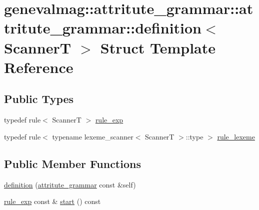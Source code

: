 \hypertarget{structgenevalmag_1_1attritute__grammar_1_1definition}{
\section{genevalmag::attritute\_\-grammar::attritute\_\-grammar::definition$<$ ScannerT $>$ Struct Template Reference}
\label{structgenevalmag_1_1attritute__grammar_1_1definition}
}
\subsection*{Public Types}
\begin{CompactItemize}
\item 
typedef rule$<$ ScannerT $>$ \hyperlink{structgenevalmag_1_1attritute__grammar_1_1definition_309e68f77fe3e7c0ebb0f06416bce39c}{rule\_\-exp}
\item 
typedef rule$<$ typename lexeme\_\-scanner$<$ ScannerT $>$::type $>$ \hyperlink{structgenevalmag_1_1attritute__grammar_1_1definition_af4afa908dd79792cfa7d2a3963b80d6}{rule\_\-lexeme}
\end{CompactItemize}
\subsection*{Public Member Functions}
\begin{CompactItemize}
\item 
\hyperlink{structgenevalmag_1_1attritute__grammar_1_1definition_c6f9c82048aa8a9bd84717dec76c4218}{definition} (\hyperlink{structgenevalmag_1_1attritute__grammar}{attritute\_\-grammar} const \&self)
\item 
\hyperlink{structgenevalmag_1_1attritute__grammar_1_1definition_309e68f77fe3e7c0ebb0f06416bce39c}{rule\_\-exp} const \& \hyperlink{structgenevalmag_1_1attritute__grammar_1_1definition_31009c1b0ad8c9520713481c070b82c9}{start} () const 
\end{CompactItemize}
